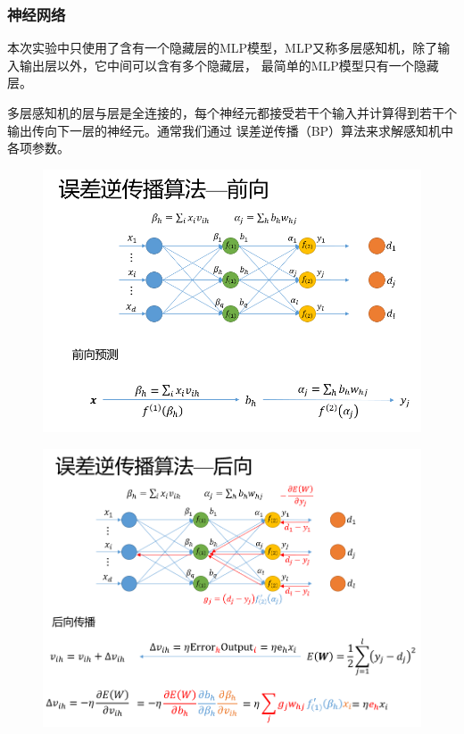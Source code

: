 \documentclass[12pt, a4paper, oneside]{ctexart}
\begin{document}
\subsubsection{神经网络}
本次实验中只使用了含有一个隐藏层的MLP模型，MLP又称多层感知机，除了输入输出层以外，它中间可以含有多个隐藏层，
最简单的MLP模型只有一个隐藏层。

多层感知机的层与层是全连接的，每个神经元都接受若干个输入并计算得到若干个输出传向下一层的神经元。通常我们通过
误差逆传播（BP）算法来求解感知机中各项参数。
\begin{figure}[H]
    \centering
    \includegraphics[scale=0.4]{3.png}
\end{figure}
\begin{figure}[H]
    \centering
    \includegraphics[scale=0.4]{4.png}
\end{figure}
\end{document}

